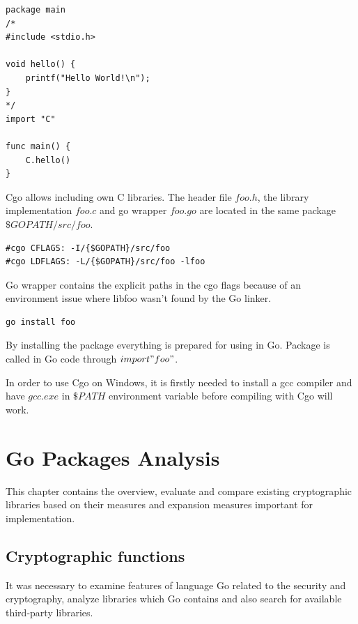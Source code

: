 \documentclass[
  twoside, 12pt, 
  printed, %
  notable,   %
  lof,     %
  lot,     %
]{fithesis3}
\begin{document}
\begin{lstlisting}
package main
/*
#include <stdio.h>

void hello() {
	printf("Hello World!\n");
}
*/
import "C"

func main() {
	C.hello()
}
\end{lstlisting}

Cgo allows including own C libraries. The header file $foo.h$, the library implementation 
$foo.c$ and go wrapper $foo.go$ are located in the same package $\$GOPATH/src/foo$. 
\begin{lstlisting}
#cgo CFLAGS: -I/{$GOPATH}/src/foo
#cgo LDFLAGS: -L/{$GOPATH}/src/foo -lfoo
\end{lstlisting}
Go wrapper contains the explicit paths in the cgo flags because of an environment issue where 
libfoo wasn’t found by the Go linker.
\begin{lstlisting} 
go install foo 
\end{lstlisting}
By installing the package everything is prepared for using in Go. Package is called in Go code 
through $import "foo"$.

In order to use Cgo on Windows, it is firstly needed to install a gcc compiler and have 
$gcc.exe$ in $\$PATH$ environment variable before compiling with Cgo will work.

\nocite{cgo-command}
\nocite{bloggolangorg}
\nocite{cgo-wiki}

\nocite{chisnall2012go}
\nocite{balbaert_2012}
\nocite{summerfield_2012}
\nocite{harris_2015}
\nocite{kozyra_2014}

\chapter{Go Packages Analysis} %
This chapter contains the overview, evaluate and compare existing cryptographic libraries based on 
their measures and expansion measures important for implementation.

\section{Cryptographic functions}
It was necessary to examine features of language Go related to the security and cryptography, analyze 
libraries which Go contains and also search for available third-party libraries. 
\end{document}
